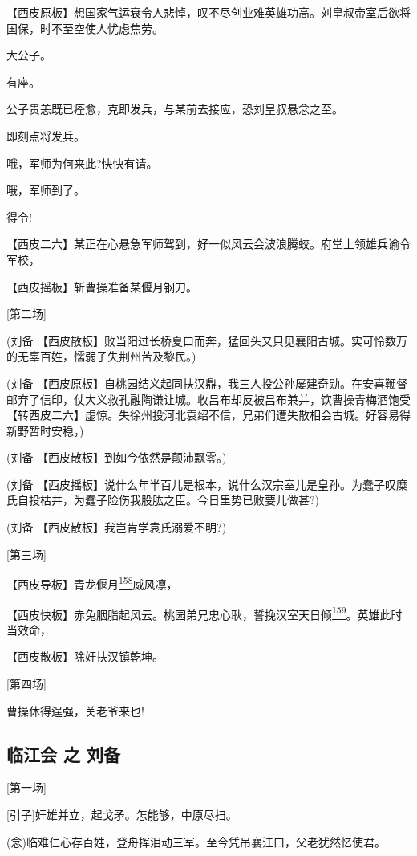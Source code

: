 【西皮原板】想国家气运衰令人悲悼，叹不尽创业难英雄功高。刘皇叔帝室后欲将国保，时不至空使人忧虑焦劳。

大公子。

有座。

公子贵恙既已痊愈，克即发兵，与某前去接应，恐刘皇叔悬念之至。

即刻点将发兵。

哦，军师为何来此?快快有请。

哦，军师到了。

得令!

【西皮二六】某正在心悬急军师驾到，好一似风云会波浪腾蛟。府堂上领雄兵谕令军校，

【西皮摇板】斩曹操准备某偃月钢刀。

{[}第二场{]}

(刘备
【西皮散板】败当阳过长桥夏口而奔，猛回头又只见襄阳古城。实可怜数万的无辜百姓，懦弱子失荆州苦及黎民。)

(刘备
【西皮原板】自桃园结义起同扶汉鼎，我三人投公孙屡建奇勋。在安喜鞭督邮弃了信印，仗大义救孔融陶谦让城。收吕布却反被吕布兼并，饮曹操青梅酒饱受【转西皮二六】虚惊。失徐州投河北袁绍不信，兄弟们遭失散相会古城。好容易得新野暂时安稳，)

(刘备 【西皮散板】到如今依然是颠沛飘零。)

(刘备
【西皮摇板】说什么年半百儿是根本，说什么汉宗室儿是皇孙。为蠢子叹糜氏自投枯井，为蠢子险伤我股肱之臣。今日里势已败要儿做甚?)

(刘备 【西皮散板】我岂肯学袁氏溺爱不明?)

{[}第三场{]}

【西皮导板】青龙偃月\protect\hyperlink{fn158}{\textsuperscript{158}}威风凛，

【西皮快板】赤兔胭脂起风云。桃园弟兄忠心耿，誓挽汉室天日倾\protect\hyperlink{fn159}{\textsuperscript{159}}。英雄此时当效命，

【西皮散板】除奸扶汉镇乾坤。

{[}第四场{]}

曹操休得逞强，关老爷来也!

\newpage
\hypertarget{ux4e34ux6c5fux4f1a-ux4e4b-ux5218ux5907}{%
\subsection{临江会 之
刘备}\label{ux4e34ux6c5fux4f1a-ux4e4b-ux5218ux5907}}

{[}第一场{]}

{[}引子{]}奸雄并立，起戈矛。怎能够，中原尽扫。

(念)临难仁心存百姓，登舟挥泪动三军。至今凭吊襄江口，父老犹然忆使君。

